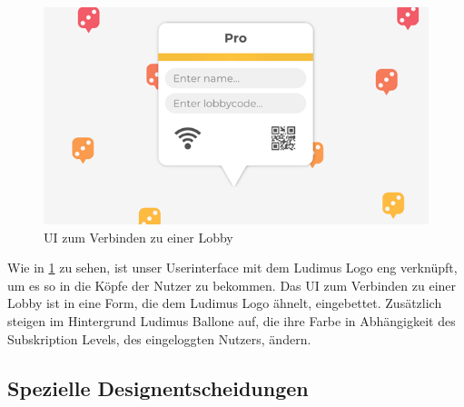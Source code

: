 \newline
\begin{center}
    \begin{figure}
        \includegraphics[scale=0.7]{images/design06.png} 
        \caption{UI zum Verbinden zu einer Lobby}
        \label{img:design06}
    \end{figure}
\end{center}
Wie in \ref{img:design06} zu sehen, ist unser Userinterface mit dem Ludimus Logo eng verknüpft, um es so in die Köpfe der Nutzer zu bekommen. Das UI zum Verbinden zu einer Lobby ist in eine Form, die dem Ludimus Logo ähnelt, eingebettet. Zusätzlich steigen im Hintergrund Ludimus Ballone auf, die ihre Farbe in Abhängigkeit des Subskription Levels, des eingeloggten Nutzers, ändern. 

\subsection{Spezielle Designentscheidungen} \label{sec:special-design}
